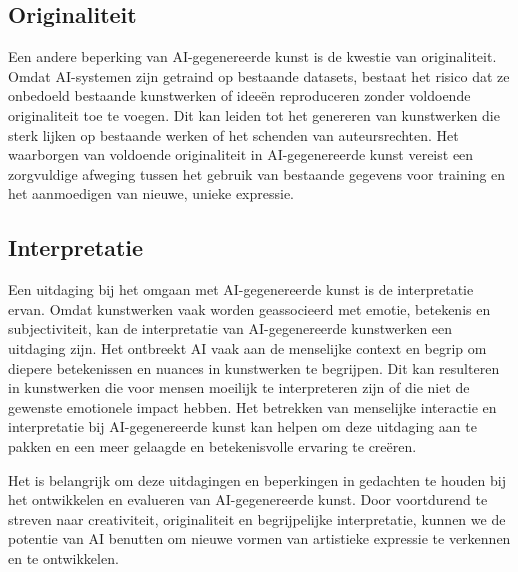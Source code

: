 \subsection{Originaliteit}
Een andere beperking van AI-gegenereerde kunst is de kwestie van originaliteit. Omdat AI-systemen zijn getraind op bestaande datasets, bestaat het risico dat ze onbedoeld bestaande kunstwerken of ideeën reproduceren zonder voldoende originaliteit toe te voegen. Dit kan leiden tot het genereren van kunstwerken die sterk lijken op bestaande werken of het schenden van auteursrechten. Het waarborgen van voldoende originaliteit in AI-gegenereerde kunst vereist een zorgvuldige afweging tussen het gebruik van bestaande gegevens voor training en het aanmoedigen van nieuwe, unieke expressie.

\subsection{Interpretatie}
Een uitdaging bij het omgaan met AI-gegenereerde kunst is de interpretatie ervan. Omdat kunstwerken vaak worden geassocieerd met emotie, betekenis en subjectiviteit, kan de interpretatie van AI-gegenereerde kunstwerken een uitdaging zijn. Het ontbreekt AI vaak aan de menselijke context en begrip om diepere betekenissen en nuances in kunstwerken te begrijpen. Dit kan resulteren in kunstwerken die voor mensen moeilijk te interpreteren zijn of die niet de gewenste emotionele impact hebben. Het betrekken van menselijke interactie en interpretatie bij AI-gegenereerde kunst kan helpen om deze uitdaging aan te pakken en een meer gelaagde en betekenisvolle ervaring te creëren.

Het is belangrijk om deze uitdagingen en beperkingen in gedachten te houden bij het ontwikkelen en evalueren van AI-gegenereerde kunst. Door voortdurend te streven naar creativiteit, originaliteit en begrijpelijke interpretatie, kunnen we de potentie van AI benutten om nieuwe vormen van artistieke expressie te verkennen en te ontwikkelen.
